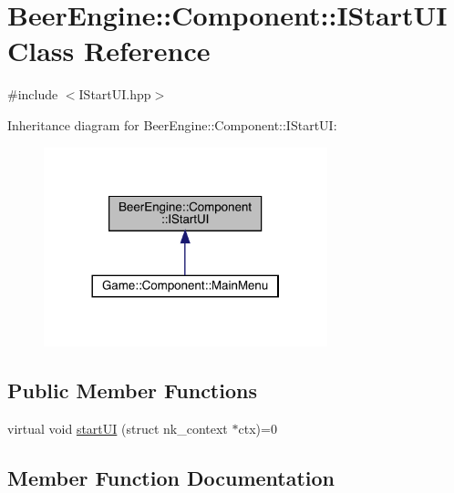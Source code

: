 \hypertarget{class_beer_engine_1_1_component_1_1_i_start_u_i}{}\section{Beer\+Engine\+:\+:Component\+:\+:I\+Start\+UI Class Reference}
\label{class_beer_engine_1_1_component_1_1_i_start_u_i}


{\ttfamily \#include $<$I\+Start\+U\+I.\+hpp$>$}



Inheritance diagram for Beer\+Engine\+:\+:Component\+:\+:I\+Start\+UI\+:
\nopagebreak
\begin{figure}[H]
\begin{center}
\leavevmode
\includegraphics[width=233pt]{class_beer_engine_1_1_component_1_1_i_start_u_i__inherit__graph}
\end{center}
\end{figure}
\subsection*{Public Member Functions}
\begin{DoxyCompactItemize}
\item 
virtual void \mbox{\hyperlink{class_beer_engine_1_1_component_1_1_i_start_u_i_a95b739f21079f5f103da42ea34f826f2}{start\+UI}} (struct nk\+\_\+context $\ast$ctx)=0
\end{DoxyCompactItemize}


\subsection{Member Function Documentation}
\mbox{\label{class_beer_engine_1_1_component_1_1_i_start_u_i_a95b739f21079f5f103da42ea34f826f2}} 
